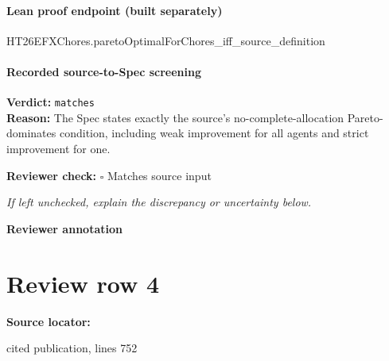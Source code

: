 \documentclass[10pt]{article}
\newcommand{\reviewerbox}{%
  \par\noindent\fbox{\parbox{0.96\linewidth}{\rule{0pt}{0.38in}}}\par
}
\newcommand{\reviewmatch}[1]{%
  \par\noindent\textbf{Reviewer check:} $\square$\; #1\par
  \noindent\emph{If left unchecked, explain the discrepancy or uncertainty below.}\par
}
\begin{document}
\paragraph{Lean proof endpoint (built separately)}\begin{ReviewVerbatim}
HT26EFXChores.paretoOptimalForChores_iff_source_definition
\end{ReviewVerbatim}

\paragraph{Recorded source-to-Spec screening}
\textbf{Verdict:} \texttt{matches}
\\
\textbf{Reason:} The Spec states exactly the source's no-complete-allocation Pareto-dominates condition, including weak improvement for all agents and strict improvement for one.
\reviewmatch{Matches source input}
\noindent\textbf{Reviewer annotation}\par
\reviewerbox
\clearpage
\hypertarget{source-claim-28f223907b1b4b26}{}
\section*{Review row 4}
\textbf{Source locator:} {\footnotesize\raggedright cited publication, lines 752\par}
\end{document}
